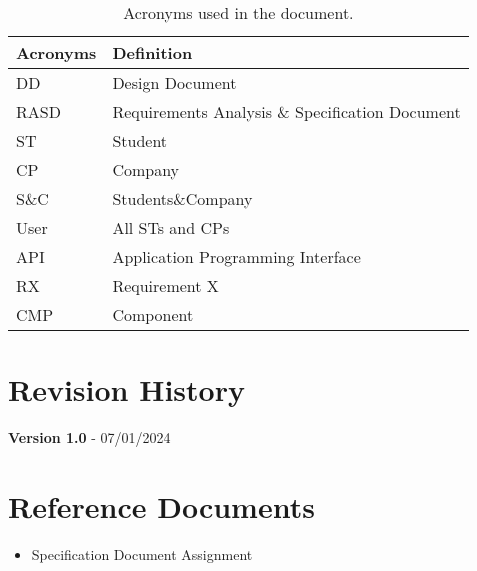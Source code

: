 \begin{table}[H]
    \begin{center}
        \begin{tabular}{ |l|l| }
            \hline
            \textbf{Acronyms} & \textbf{Definition}                              \\
            \hline
            DD             & Design Document                      \\
            \hline            
            RASD             & Requirements Analysis \& Specification Document     \\   
            \hline
            ST              & Student                         \\
            \hline
            CP              & Company                         \\
            \hline
            S\&C             & Students\&Company                   \\
            \hline
            User            & All STs and CPs                           \\
            \hline
            API             & Application Programming Interface       \\
            \hline
            RX              & Requirement X                           \\
            \hline
            CMP            & Component                           \\
            \hline
         \end{tabular}
        \caption{Acronyms used in the document.}
        \label{tab:acronyms}%
    \end{center}
\end{table}

\section{Revision History}
\label{sec:revision_history}%
\textbf{Version 1.0} - 07/01/2024

\section{Reference Documents}
\label{sec:reference_documents}%

\begin{itemize}
    \item Specification Document Assignment
\end{itemize}

